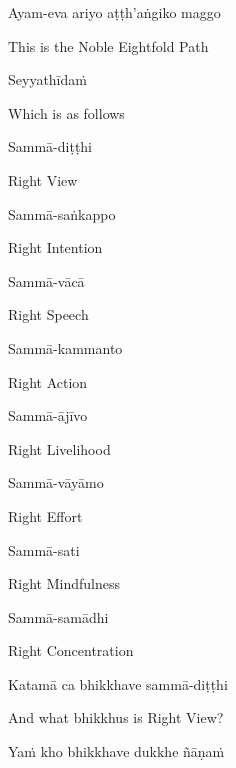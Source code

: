 Ayam-eva ariyo aṭṭh'aṅgiko maggo

\begin{cprenglish}
  This is the Noble Eightfold Path
\end{cprenglish}

Seyyathīdaṁ

\begin{cprenglish}
  Which is as follows
\end{cprenglish}

Sammā-diṭṭhi

\begin{cprenglish}
  Right View
\end{cprenglish}

Sammā-saṅkappo

\begin{cprenglish}
  Right Intention
\end{cprenglish}

Sammā-vācā

\begin{cprenglish}
  Right Speech
\end{cprenglish}

Sammā-kammanto

\begin{cprenglish}
  Right Action
\end{cprenglish}

Sammā-ājīvo

\begin{cprenglish}
  Right Livelihood
\end{cprenglish}

Sammā-vāyāmo

\begin{cprenglish}
  Right Effort
\end{cprenglish}

Sammā-sati

\begin{cprenglish}
  Right Mindfulness
\end{cprenglish}

Sammā-samādhi

\begin{cprenglish}
  Right Concentration
\end{cprenglish}

Katamā ca bhikkhave sammā-diṭṭhi

\begin{cprenglish}
  And what bhikkhus is Right View?
\end{cprenglish}

Yaṁ kho bhikkhave dukkhe ñāṇaṁ

